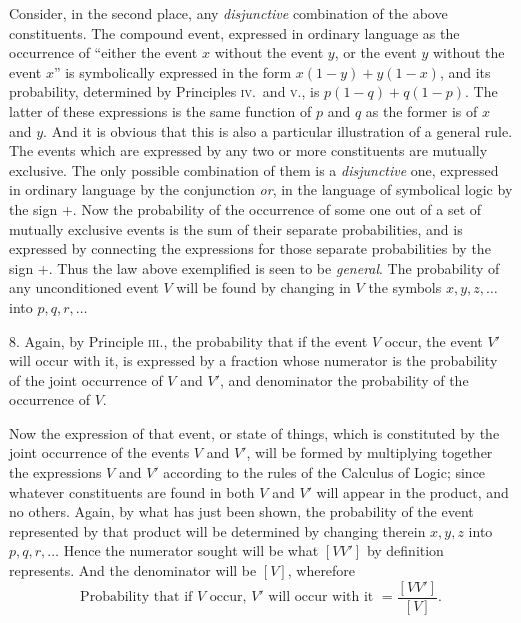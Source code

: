 \documentclass[oneside]{book}
\begin{document}
Consider, in the second place, any \emph{disjunctive} combination of
the above constituents. The compound event, expressed in ordinary
language as the occurrence of ``either the event $x$ without
the event $y$, or the event $y$ without the event $x$'' is symbolically
expressed in the form $x(1-y)+y(1-x)$, and its probability,
determined by Principles \textsc{iv}.\ and \textsc{v}., is $p(1-q)+q(1-p)$. The
latter of these expressions is the same function of $p$ and $q$ as the
former is of $x$ and $y$. And it is obvious that this is also a particular
illustration of a general rule. The events which are expressed
by any two or more constituents are mutually exclusive.
The only possible combination of them is a \emph{disjunctive} one, expressed
in ordinary language by the conjunction \emph{or}, in the language
of symbolical logic by the sign +. Now the probability of
the occurrence of some one out of a set of mutually exclusive
events is the sum of their separate probabilities, and is expressed
by connecting the expressions for those separate probabilities by
the sign +. Thus the law above exemplified is seen to be \emph{general}.
The probability of any unconditioned event $V$ will be found by
changing in $V$ the symbols $x, y, z, \dotsc$ into $p, q, r, \dotsc$

8. Again, by Principle \textsc{iii}., the probability that if the event
$V$ occur, the event $V'$ will occur with it, is expressed by a
fraction whose numerator is the probability of the joint occurrence
of $V$ and $V'$, and denominator the probability of the occurrence
of $V$.

Now the expression of that event, or state of things, which is
constituted by the joint occurrence of the events $V$ and $V'$, will
be formed by multiplying together the expressions $V$ and $V'$ according
to the rules of the Calculus of Logic; since whatever
constituents are found in both $V$ and $V'$ will appear in the product,
and no others. Again, by what has just been shown, the
probability of the event represented by that product will be determined by
changing therein $x, y, z$ into $p, q, r,\dotsc$ Hence the
numerator sought will be what $[VV']$ by definition represents.
And the denominator will be $[V]$, wherefore
\[
  \text{Probability that if $V$ occur, $V'$ will occur with it }
  = \frac{[VV']}{[V]}.
\]
\end{document}
